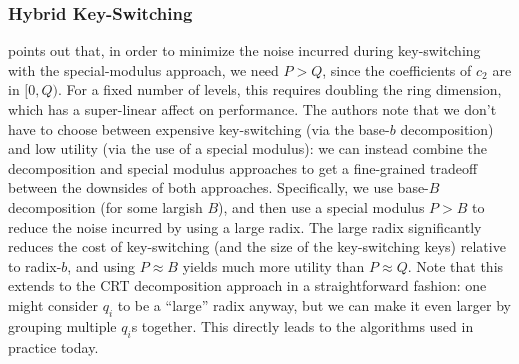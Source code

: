 \documentclass[../../fheimpl.tex]{subfiles}
\begin{document}
\subsubsection{Hybrid Key-Switching}
\cite{cryptoeprint:2012/099} points out that, in order to minimize the noise incurred during key-switching with the special-modulus approach, we need $P > Q$, since the coefficients of $c_2$ are in $[0,Q)$. For a fixed number of levels, this requires doubling the ring dimension, which has a super-linear affect on performance. The authors note that we don't have to choose between expensive key-switching (via the base-$b$ decomposition) and low utility (via the use of a special modulus): we can instead combine the decomposition and special modulus approaches to get a fine-grained tradeoff between the downsides of both approaches. Specifically, we use base-$B$ decomposition (for some largish $B$), and then use a special modulus $P > B$ to reduce the noise incurred by using a large radix. The large radix significantly reduces the cost of key-switching (and the size of the key-switching keys) relative to radix-$b$, and using $P\approx B$ yields much more utility than $P\approx Q$. Note that this extends to the CRT decomposition approach in a straightforward fashion: one might consider $q_i$ to be a ``large'' radix anyway, but we can make it even larger by grouping multiple $q_i$s together. This directly leads to the algorithms used in practice today.

\ifcompileasbook
\else
\printbibliography
\fi
\end{document}
